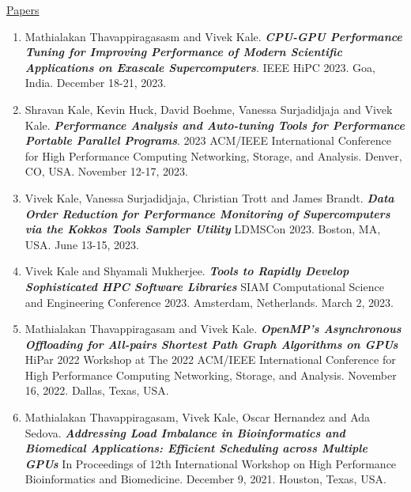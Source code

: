 




\underline{Papers}
\begin{enumerate} 
\item Mathialakan Thavappiragasasm and Vivek Kale. \textbf{\textit{CPU-GPU Performance Tuning for Improving Performance of Modern Scientific Applications on Exascale Supercomputers}}. IEEE HiPC 2023. Goa, India. December 18-21, 2023.
\item Shravan Kale, Kevin Huck, David Boehme, Vanessa Surjadidjaja and Vivek Kale. \textbf{\textit{Performance Analysis and Auto-tuning Tools for Performance Portable Parallel Programs}}. 2023 ACM/IEEE International Conference for High Performance Computing Networking, Storage, and Analysis. Denver, CO, USA. November 12-17, 2023.

\item Vivek Kale, Vanessa Surjadidjaja, Christian Trott and James Brandt. \textbf{\textit{Data Order Reduction for Performance Monitoring of Supercomputers via the Kokkos Tools Sampler Utility}} LDMSCon 2023. Boston, MA, USA. June 13-15, 2023. 

\item Vivek Kale and Shyamali Mukherjee. \textbf{\textit{Tools to Rapidly Develop Sophisticated HPC Software Libraries}} SIAM Computational Science and Engineering Conference 2023. Amsterdam, Netherlands. March 2, 2023.

\item Mathialakan Thavappiragasam and Vivek Kale. \textbf{\textit{OpenMP’s Asynchronous Offloading for All-pairs Shortest Path Graph Algorithms on GPUs}}  HiPar 2022 Workshop at The 2022 ACM/IEEE International Conference for High Performance Computing Networking, Storage, and Analysis. November 16, 2022. Dallas, Texas, USA. 

\item Mathialakan Thavappiragasam, Vivek Kale, Oscar Hernandez and  Ada Sedova. \textbf{\textit{Addressing Load Imbalance in Bioinformatics and Biomedical Applications: Efficient Scheduling across Multiple GPUs}} In Proceedings of 12th International Workshop on High Performance Bioinformatics and Biomedicine. December 9, 2021. Houston, Texas, USA. 


\end{enumerate}
